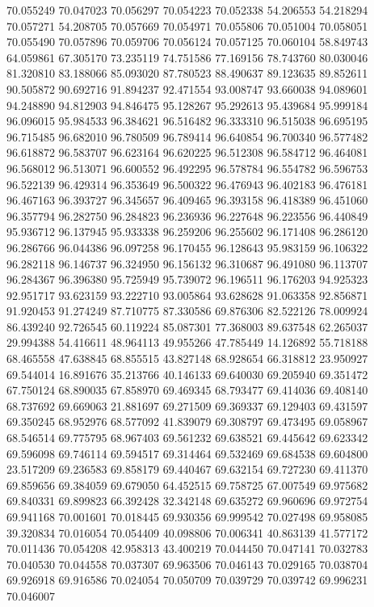 70.055249
70.047023
70.056297
70.054223
70.052338
54.206553
54.218294
70.057271
54.208705
70.057669
70.054971
70.055806
70.051004
70.058051
70.055490
70.057896
70.059706
70.056124
70.057125
70.060104
58.849743
64.059861
67.305170
73.235119
74.751586
77.169156
78.743760
80.030046
81.320810
83.188066
85.093020
87.780523
88.490637
89.123635
89.852611
90.505872
90.692716
91.894237
92.471554
93.008747
93.660038
94.089601
94.248890
94.812903
94.846475
95.128267
95.292613
95.439684
95.999184
96.096015
95.984533
96.384621
96.516482
96.333310
96.515038
96.695195
96.715485
96.682010
96.780509
96.789414
96.640854
96.700340
96.577482
96.618872
96.583707
96.623164
96.620225
96.512308
96.584712
96.464081
96.568012
96.513071
96.600552
96.492295
96.578784
96.554782
96.596753
96.522139
96.429314
96.353649
96.500322
96.476943
96.402183
96.476181
96.467163
96.393727
96.345657
96.409465
96.393158
96.418389
96.451060
96.357794
96.282750
96.284823
96.236936
96.227648
96.223556
96.440849
95.936712
96.137945
95.933338
96.259206
96.255602
96.171408
96.286120
96.286766
96.044386
96.097258
96.170455
96.128643
95.983159
96.106322
96.282118
96.146737
96.324950
96.156132
96.310687
96.491080
96.113707
96.284367
96.396380
95.725949
95.739072
96.196511
96.176203
94.925323
92.951717
93.623159
93.222710
93.005864
93.628628
91.063358
92.856871
91.920453
91.274249
87.710775
87.330586
69.876306
82.522126
78.009924
86.439240
92.726545
60.119224
85.087301
77.368003
89.637548
62.265037
29.994388
54.416611
48.964113
49.955266
47.785449
14.126892
55.718188
68.465558
47.638845
68.855515
43.827148
68.928654
66.318812
23.950927
69.544014
16.891676
35.213766
40.146133
69.640030
69.205940
69.351472
67.750124
68.890035
67.858970
69.469345
68.793477
69.414036
69.408140
68.737692
69.669063
21.881697
69.271509
69.369337
69.129403
69.431597
69.350245
68.952976
68.577092
41.839079
69.308797
69.473495
69.058967
68.546514
69.775795
68.967403
69.561232
69.638521
69.445642
69.623342
69.596098
69.746114
69.594517
69.314464
69.532469
69.684538
69.604800
23.517209
69.236583
69.858179
69.440467
69.632154
69.727230
69.411370
69.859656
69.384059
69.679050
64.452515
69.758725
67.007549
69.975682
69.840331
69.899823
66.392428
32.342148
69.635272
69.960696
69.972754
69.941168
70.001601
70.018445
69.930356
69.999542
70.027498
69.958085
39.320834
70.016054
70.054409
40.098806
70.006341
40.863139
41.577172
70.011436
70.054208
42.958313
43.400219
70.044450
70.047141
70.032783
70.040530
70.044558
70.037307
69.963506
70.046143
70.029165
70.038704
69.926918
69.916586
70.024054
70.050709
70.039729
70.039742
69.996231
70.046007
